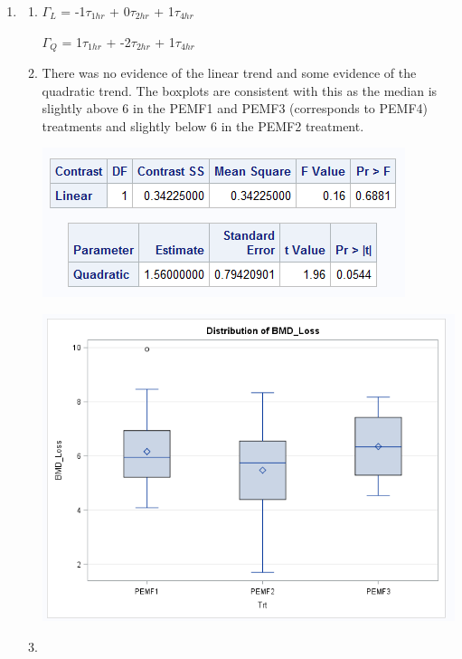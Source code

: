 \documentclass{article}\usepackage[]{graphicx}\usepackage[]{color}
\begin{document}
\begin{enumerate}
\item 
\begin{enumerate}
\item 

$\Gamma_{L}$ = -1$\tau_{1hr}$ + 0$\tau_{2hr}$ + 1$\tau_{4hr}$

$\Gamma_{Q}$ = 1$\tau_{1hr}$ + -2$\tau_{2hr}$ + 1$\tau_{4hr}$

\item 

There was no evidence of the linear trend and some evidence of the quadratic trend. The boxplots are consistent with this as the median is slightly above 6 in the PEMF1 and PEMF3 (corresponds to PEMF4) treatments and slightly below 6 in the PEMF2 treatment.


\begin{center}
\includegraphics{prob2g1}
\end{center}

\begin{center}
\includegraphics[scale=0.5]{boxplots1}
\end{center}

\item 


\end{enumerate}
\end{enumerate}
\end{document}

